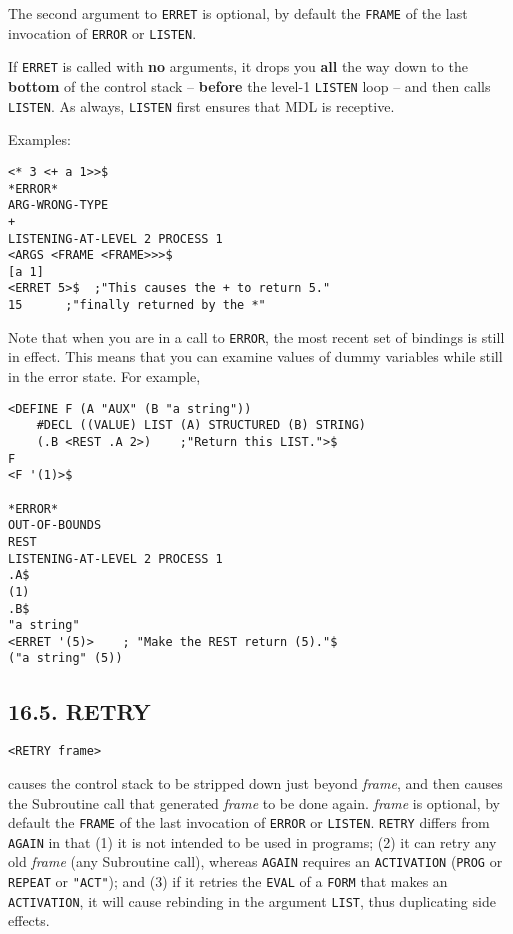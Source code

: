 \documentclass[a4paper,]{article}
\begin{document}
The second argument to \texttt{ERRET} is optional, by default the \texttt{FRAME} of the last invocation of \texttt{ERROR}
or \texttt{LISTEN}.

If \texttt{ERRET} is called with \textbf{no} arguments, it drops you \textbf{all} the way down to the \textbf{bottom} of
the control stack -- \textbf{before} the level-1 \texttt{LISTEN} loop -- and then calls \texttt{LISTEN}. As always,
\texttt{LISTEN} first ensures that MDL is receptive.

Examples:

\begin{verbatim}
<* 3 <+ a 1>>$
*ERROR*
ARG-WRONG-TYPE
+
LISTENING-AT-LEVEL 2 PROCESS 1
<ARGS <FRAME <FRAME>>>$
[a 1]
<ERRET 5>$  ;"This causes the + to return 5."
15      ;"finally returned by the *"
\end{verbatim}

Note that when you are in a call to \texttt{ERROR}, the most recent set of bindings is still in effect. This means that you
can examine values of dummy variables while still in the error state. For example,

\begin{verbatim}
<DEFINE F (A "AUX" (B "a string"))
    #DECL ((VALUE) LIST (A) STRUCTURED (B) STRING)
    (.B <REST .A 2>)    ;"Return this LIST.">$
F
<F '(1)>$

*ERROR*
OUT-OF-BOUNDS
REST
LISTENING-AT-LEVEL 2 PROCESS 1
.A$
(1)
.B$
"a string"
<ERRET '(5)>    ; "Make the REST return (5)."$
("a string" (5))
\end{verbatim}

\subsection{16.5. RETRY}\label{retry}

\begin{verbatim}
<RETRY frame>
\end{verbatim}

 causes the control stack to be stripped down just beyond \emph{frame}, and then causes the
Subroutine call that generated \emph{frame} to be done again. \emph{frame} is optional, by default the \texttt{FRAME} of
the last invocation of \texttt{ERROR} or \texttt{LISTEN}. \texttt{RETRY} differs from \texttt{AGAIN} 
in that (1) it is not intended to be used in programs; (2) it can retry any old \emph{frame} (any Subroutine call), whereas
\texttt{AGAIN} requires an \texttt{ACTIVATION}  (\texttt{PROG} or \texttt{REPEAT} or
\texttt{"ACT"}); and (3) if it retries the \texttt{EVAL} of a \texttt{FORM} that makes an \texttt{ACTIVATION}, it will
cause rebinding in the argument \texttt{LIST}, thus duplicating side effects.
\end{document}
